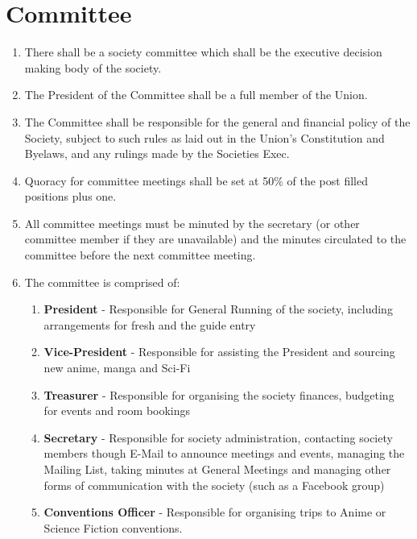 \documentclass[a4paper,10pt]{article}
\begin{document}
\section{Committee}
\begin{enumerate}
  \item There shall be a society committee which shall be the executive decision making body of the society.
  \item The President of the Committee shall be a full member of the Union.
  \item The Committee shall be responsible for the general and financial policy of the Society, subject to such rules as laid out in the Union’s Constitution and Byelaws, and any rulings made by the Societies Exec.
  \item Quoracy for committee meetings shall be set at 50\% of the post filled positions plus one.
  \item All committee meetings must be minuted by the secretary (or other committee member if they are unavailable) and the minutes circulated to the committee before the next committee meeting.
  \item The committee is comprised of:
  \begin{enumerate}
    \item \textbf{President} - Responsible for General Running of the society, including arrangements for fresh and the guide entry
    \item \textbf{Vice-President} - Responsible for assisting the President and sourcing new anime, manga and Sci-Fi
    \item \textbf{Treasurer} - Responsible for organising the society finances, budgeting for events and room bookings
    \item \textbf{Secretary} - Responsible for society administration, contacting society members though E-Mail to announce meetings and events, managing the Mailing List, taking minutes at General Meetings and managing other forms of communication with the society (such as a Facebook group)
    \item \textbf{Conventions Officer} - Responsible for organising trips to Anime or Science Fiction conventions.
  \end{enumerate}
\end{enumerate}
\end{document}
